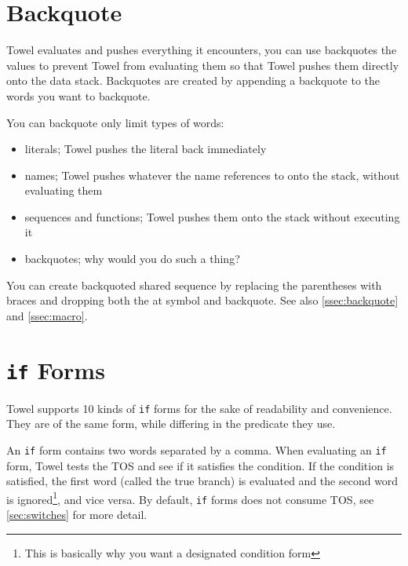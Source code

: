\documentclass{report}
\begin{document}
\section{Backquote}

Towel evaluates and pushes everything it encounters, you can use backquotes the values to prevent Towel from evaluating them so that Towel pushes them directly onto the data stack. Backquotes are created by appending a backquote to the words you want to backquote.

You can backquote only limit types of words:
\begin{itemize}
\item literals; Towel pushes the literal back immediately
\item names; Towel pushes whatever the name references to onto the stack, without evaluating them
\item sequences and functions; Towel pushes them onto the stack without executing it
\item backquotes; why would you do such a thing?
\end{itemize}

\begin{mdframed}[style=hint]
  You can create backquoted shared sequence by replacing the
  parentheses with braces and dropping both the at symbol and
  backquote. See also \autoref{ssec:backquote} and
  \autoref{ssec:macro}.
\end{mdframed}
\section{\texttt{if} Forms}

Towel supports 10 kinds of \texttt{if} forms for the sake of readability and convenience. They are of the same form, while differing in the predicate they use.

An \texttt{if} form contains two words separated by a comma. When evaluating an \texttt{if} form, Towel tests the TOS and see if it satisfies the condition. If the condition is satisfied, the first word (called the true branch) is evaluated and the second word is ignored\footnote{This is basically why you want a designated condition form}, and vice versa. By default, \texttt{if} forms does not consume TOS, see \autoref{sec:switches} for more detail.
\end{document}
